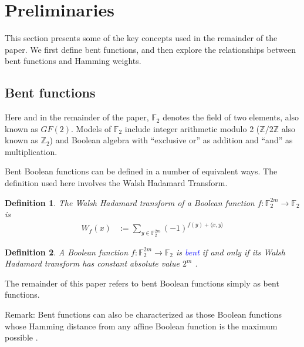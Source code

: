 \documentclass[12pt,a4paper]{article}
\newcommand{\mb}[1]{\mathbb{#1}}
\newcommand{\F}{\mb{F}}
\newcommand{\Z}{\mb{Z}}
\newcommand{\To}{\rightarrow}
\newcommand{\Emph}[1]{\emph{\textcolor{blue}{#1}}}
\newtheorem{Definition}{Definition}
\begin{document}
\section{Preliminaries}
\label{sec-Preliminaries}

This section presents some of the key concepts used in the remainder of the paper.
We first define bent functions, and then explore the relationships between bent functions
and Hamming weights.

\subsection{Bent functions}

Here and in the remainder of the paper, $\F_2$ denotes the field of two elements,
also known as $GF(2)$. Models of $\F_2$ include integer arithmetic modulo 2
($\Z/2\Z$ also known as $\Z_2$) and Boolean algebra with ``exclusive or'' as addition and ``and''
as multiplication.

Bent Boolean functions can be defined in a number of equivalent ways.
The definition used here involves the Walsh Hadamard Transform.
\begin{Definition}
\label{def-Walsh-Hadamard-transform}
The Walsh Hadamard transform of
a Boolean function $f : \F_2^{2m} \To \F_2$ is
\begin{align*}
W_f(x)
&:=
\sum_{y \in \F_2^{2m}} (-1)^{f(y) + \langle x, y \rangle}
\end{align*}
\end{Definition}

\begin{Definition}
\label{def-Bent-function}
A Boolean function $f : \F_2^{2m} \To \F_2$ is \Emph{bent}
if and only if its Walsh Hada\-mard transform has constant absolute value $2^{m}$ \cite[p. 74]{Dil74}
\cite[p. 300]{Rot76}.
\end{Definition}

The remainder of this paper refers to bent Boolean functions simply as bent functions.

Remark: Bent functions can also be characterized as those Boolean functions whose Hamming distance
from any affine Boolean function is the maximum possible \cite[Ch. 14 Theorem 6]{MacS77} \cite[Theorem 3.3]{MeiS90}.
\end{document}
